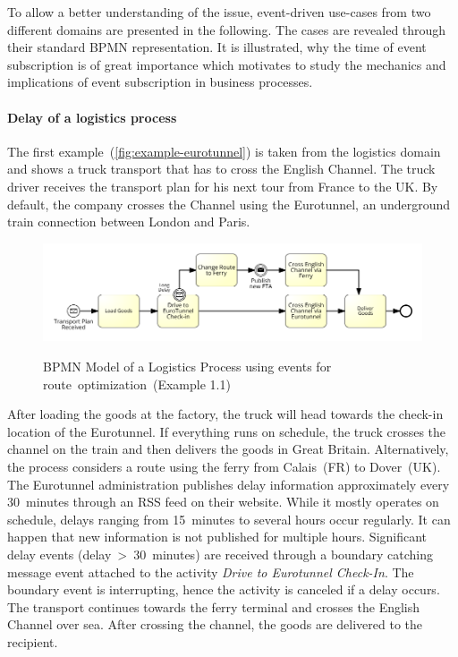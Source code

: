 To allow a better understanding of the issue, event-driven use-cases from two different domains are presented in the following.
The cases are revealed through their standard BPMN representation.
It is illustrated, why the time of event subscription is of great importance which motivates to study the mechanics and implications of event subscription in business processes.

\paragraph{Delay of a logistics process}
The first example~(\autoref{fig:example-eurotunnel}) is taken from the logistics domain and shows a truck transport that has to cross the English Channel.
The truck driver receives the transport plan for his next tour from France to the UK. By default, the company crosses the Channel using the Eurotunnel, an underground train connection between London and Paris.

\begin{figure}[]
	\myfloatalign
	{\includegraphics[width=1\linewidth]{chapters/requirements/Eurotunnel-simplified.png}}
	\caption{BPMN Model of a Logistics Process using events for route~optimization~(Example 1.1)}
	\label{fig:example-eurotunnel}
\end{figure}

After loading the goods at the factory, the truck will head towards the check-in location of the Eurotunnel.
If everything runs on schedule, the truck crosses the channel on the train and then delivers the goods in Great Britain.
Alternatively, the process considers a route using the ferry from Calais~(FR) to Dover~(UK).
The Eurotunnel administration publishes delay information approximately every 30~minutes through an RSS feed on their website. While it mostly operates on schedule, delays ranging from 15~minutes to several hours occur regularly. It can happen that new information is not published for multiple hours.
Significant delay events (delay~>~30~minutes) are received through a boundary catching message event attached to the activity \textit{Drive to Eurotunnel Check-In}. The boundary event is interrupting, hence the activity is canceled if a delay occurs.
The transport continues towards the ferry terminal and crosses the English Channel over sea. After crossing the channel, the goods are delivered to the recipient.

